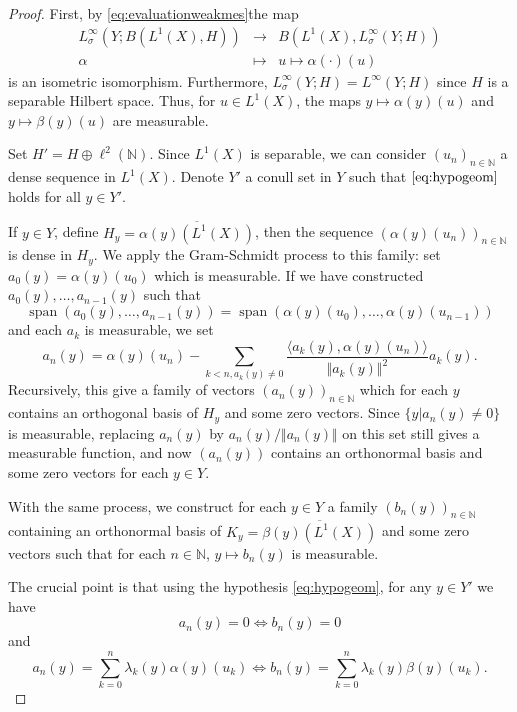 \documentclass{article}
\theoremstyle{definition}
\theoremstyle{remark}
\numberwithin{equation}{section}
\newcommand{\N}{\mathbb{N}}
\newcommand{\fon}[4]{\begin{array}{ccc}
#1 & \rightarrow & #2 \\
#3 & \longmapsto & #4 \end{array}}
\DeclareMathOperator{\vspan}{span}
\begin{document}
\begin{proof}
    First, by \eqref{eq:evaluationweakmes}the map $$\fon{L^\infty_\sigma\left(Y;B\left(L^1(X),H\right)\right)}{B\left(L^1(X),L^\infty_\sigma\left(Y;H\right)\right)}{\alpha}{u\mapsto \alpha(\cdot)(u)}$$is an isometric isomorphism. Furthermore, $L^\infty_\sigma(Y;H)=L^\infty(Y;H)$ since $H$ is a separable Hilbert space. Thus, for $u\in L^1(X)$, the maps $y\mapsto \alpha(y)(u)$ and $y\mapsto \beta(y)(u)$ are measurable.\smallskip

    Set $H'=H\oplus \ell^2(\N)$. Since $L^1(X)$ is separable, we can consider $(u_n)_{n\in \N}$ a dense sequence in $L^1(X)$. Denote $Y'$ a conull set in $Y$ such that $\eqref{eq:hypogeom}$ holds for all $y\in Y'$.\smallskip

    If $y\in Y$, define $H_y=\overline{\alpha(y)(L^1(X))}$, then the sequence $\left(\alpha(y)(u_n)\right)_{n\in \N}$ is dense in $H_y$. We apply the Gram-Schmidt process to this family: set $a_0(y)=\alpha(y)(u_0)$ which is measurable. If we have constructed $a_0(y),\dots,a_{n-1}(y)$ such that $$\vspan(a_0(y),\dots,a_{n-1}(y))=\vspan (\alpha(y)(u_0),\dots,\alpha(y)(u_{n-1}))$$ and each $a_k$ is measurable, we set $$a_n(y)=\alpha(y)(u_n)-\sum_{k<n,a_k(y)\neq 0} \frac{\langle a_k(y), \alpha(y)(u_n)\rangle}{\Vert a_k(y)\Vert^2} a_k(y).$$Recursively, this give a family of vectors $(a_n(y))_{n\in \N}$ which for each $y$ contains an orthogonal basis of $H_y$ and some zero vectors. Since $\{y \vert a_n(y)\neq 0\}$ is measurable, replacing $a_n(y)$ by $a_n(y)/\Vert a_n(y)\Vert$ on this set still gives a measurable function, and now $(a_n(y))$ contains an orthonormal basis and some zero vectors for each $y\in Y$.\smallskip

    With the same process, we construct for each $y\in Y$ a family $\left(b_n(y)\right)_{n\in \N}$ containing an orthonormal basis of $K_y=\overline{\beta(y)(L^1(X))}$ and some zero vectors such that for each $n\in \N$, $y\mapsto b_n(y)$ is measurable.\smallskip

    The crucial point is that using the hypothesis \eqref{eq:hypogeom}, for any $y\in Y'$ we have \begin{equation}
        \label{eq:null} a_n(y)=0 \Longleftrightarrow b_n(y)=0
    \end{equation}
    and
    \begin{equation}
        \label{eq:decompo} a_n(y)=\sum_{k=0}^n \lambda_k(y)\alpha(y)(u_k) \Longleftrightarrow b_n(y)= \sum_{k=0}^n \lambda_k(y)\beta(y)(u_k).
    \end{equation}


\end{proof}
\end{document}
